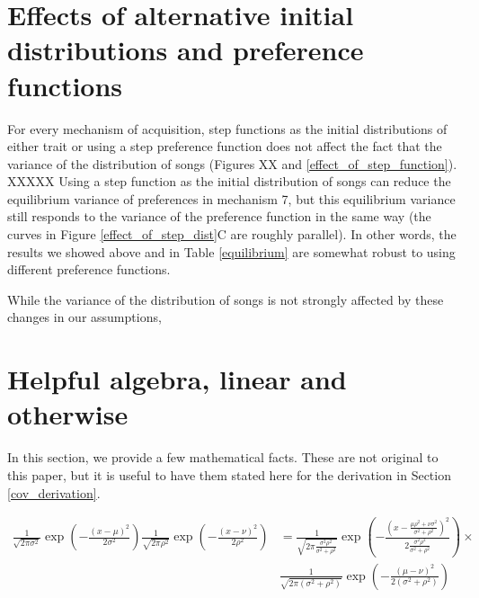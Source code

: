 \documentclass{article}
\begin{document}
\newpage
\section{Effects of alternative initial distributions and preference functions}

For every mechanism of acquisition, step functions as the initial distributions of either trait or using a step preference function does not affect the fact that the variance of the distribution of songs  (Figures XX and \ref{effect_of_step_function}). 
XXXXX
Using a step function as the initial distribution of songs can reduce the equilibrium variance of preferences in mechanism 7, but this equilibrium variance still responds to the variance of the preference function in the same way (the curves in Figure \ref{effect_of_step_dist}C are roughly parallel). In other words, the results we showed above and in Table \ref{equilibrium} are somewhat robust to using different preference functions. 

While the variance of the distribution of songs is not strongly affected by these changes in our assumptions,
\section{Helpful algebra, linear and otherwise}
In this section, we provide a few mathematical facts. These are not original to this paper, but it is useful to have them stated here for the derivation in Section \ref{cov_derivation}.
\begin{fact} \label{univariate}
\begin{align*}
\frac{1}{\sqrt{2\pi\sigma^2}}\exp\left(-\frac{(x-\mu)^2}{2\sigma^2}\right)\frac{1}{\sqrt{2\pi\rho^2}}\exp\left(-\frac{(x-\nu)^2}{2\rho^2}\right)&=\frac{1}{\sqrt{2\pi\frac{\sigma^2\rho^2}{\sigma^2+\rho^2}}}\exp\left(-\frac{\left(x-\frac{\mu\rho^2+\nu\sigma^2}{\sigma^2+\rho^2}\right)^2}{2\frac{\sigma^2\rho^2}{\sigma^2+\rho^2}}\right)\times
\\&\frac{1}{\sqrt{2\pi(\sigma^2+\rho^2)}}\exp\left(-\frac{(\mu-\nu)^2}{2(\sigma^2+\rho^2)}\right)
\end{align*}
\end{fact}
\end{document}
